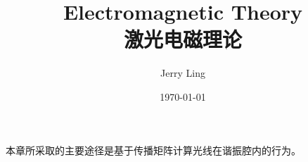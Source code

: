 \documentclass[12pt]{ctexart}%
\title{Electromagnetic Theory\\激光电磁理论}
\author{Jerry Ling}
\date{\today}
\begin{document}
\maketitle
本章所采取的主要途径是基于传播矩阵计算光线在谐振腔内的行为。
\end{document}
